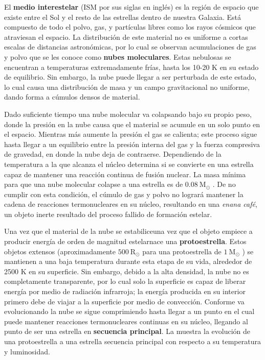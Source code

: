 El \textbf{medio interestelar} (ISM por sus siglas en inglés) es la región de
espacio que existe entre el Sol y el resto de las estrellas dentro de nuestra
Galaxia. Está compuesto de todo el polvo, gas, y partículas libres como los
rayos cósmicos que atraviesan el espacio. La distribución de este material no es
uniforme a cortas escalas de distancias astronómicas, por lo cual se observan
acumulaciones de gas y polvo que se les conoce como \textbf{nubes moleculares}.
Estas nebulosas se encuentran a temperaturas extremadamente frías, hasta los
10-20 K en su estado de equilibrio. Sin embargo, la nube puede llegar a ser
perturbada de este estado, lo cual causa una distribución de masa y un campo
gravitacional no uniforme, dando forma a cúmulos densos de material.


Dado suficiente tiempo una nube molecular va colapsando bajo su propio peso,
donde la presión en la nube causa que el material se acumule en un solo punto en
el espacio. Mientras más aumente la presión el gas se calienta; este proceso
sigue hasta llegar a un equilibrio entre la presión interna del gas y la fuerza
compresiva de gravedad, en donde la nube deja de contraerse. Dependiendo de la
temperatura a la que alcanza el núcleo determina si se convierte en una estrella
capaz de mantener una reacción continua de fusión nuclear. La masa mínima para
que una nube molecular colapse a una estrella es de $0.08 \ \mathrm{M}_{\odot}$
. De no cumplir con esta condición, el
cúmulo de gas y polvo no logrará mantener la cadena de reacciones termonucleares
en su núcleo, resultando en una \textit{enana café}, un objeto inerte resultado
del proceso fallido de formación estelar.

Una vez que el material de la nube se estabilice\textemdash una vez que el objeto empiece a producir energía de orden de magnitud estelar\textemdash nace una \textbf{protoestrella}. Estos objetos extensos (aproximadamente $500 \ \mathrm{R}_{\odot}$ para una protoestrella de $1 \ \mathrm{M}_{\odot}$ ) se mantienen a una baja temperatura durante esta etapa de su vida, alrededor de 2500 K en su superficie. Sin embargo, debido a la alta densidad, la nube no es completamente transparente, por lo cual solo la superficie es capaz de liberar energía por medio de radiación infrarroja; la energía producida en su interior primero debe de viajar a la superficie por medio de convección. Conforme va evolucionando la nube se sigue comprimiendo hasta llegar a un punto en el cual puede mantener reacciones termonucleares continuas en su núcleo, llegando al punto de ser una estrella en \textbf{secuencia principal}. La  muestra la evolución de una protoestrella a una estrella secuencia principal con respecto a su temperatura y luminosidad.

